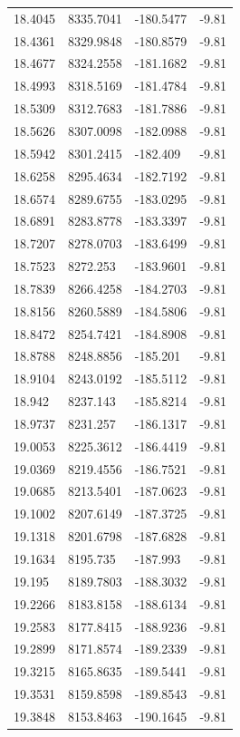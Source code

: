 \begin{table}[H]
\begin{tabular}{llll}
18.4045 & 8335.7041 & -180.5477 & -9.81 \\
18.4361 & 8329.9848 & -180.8579 & -9.81 \\
18.4677 & 8324.2558 & -181.1682 & -9.81 \\
18.4993 & 8318.5169 & -181.4784 & -9.81 \\
18.5309 & 8312.7683 & -181.7886 & -9.81 \\
18.5626 & 8307.0098 & -182.0988 & -9.81 \\
18.5942 & 8301.2415 & -182.409 & -9.81 \\
18.6258 & 8295.4634 & -182.7192 & -9.81 \\
18.6574 & 8289.6755 & -183.0295 & -9.81 \\
18.6891 & 8283.8778 & -183.3397 & -9.81 \\
18.7207 & 8278.0703 & -183.6499 & -9.81 \\
18.7523 & 8272.253 & -183.9601 & -9.81 \\
18.7839 & 8266.4258 & -184.2703 & -9.81 \\
18.8156 & 8260.5889 & -184.5806 & -9.81 \\
18.8472 & 8254.7421 & -184.8908 & -9.81 \\
18.8788 & 8248.8856 & -185.201 & -9.81 \\
18.9104 & 8243.0192 & -185.5112 & -9.81 \\
18.942 & 8237.143 & -185.8214 & -9.81 \\
18.9737 & 8231.257 & -186.1317 & -9.81 \\
19.0053 & 8225.3612 & -186.4419 & -9.81 \\
19.0369 & 8219.4556 & -186.7521 & -9.81 \\
19.0685 & 8213.5401 & -187.0623 & -9.81 \\
19.1002 & 8207.6149 & -187.3725 & -9.81 \\
19.1318 & 8201.6798 & -187.6828 & -9.81 \\
19.1634 & 8195.735 & -187.993 & -9.81 \\
19.195 & 8189.7803 & -188.3032 & -9.81 \\
19.2266 & 8183.8158 & -188.6134 & -9.81 \\
19.2583 & 8177.8415 & -188.9236 & -9.81 \\
19.2899 & 8171.8574 & -189.2339 & -9.81 \\
19.3215 & 8165.8635 & -189.5441 & -9.81 \\
19.3531 & 8159.8598 & -189.8543 & -9.81 \\
19.3848 & 8153.8463 & -190.1645 & -9.81 \\

\end{tabular}
\end{table}
